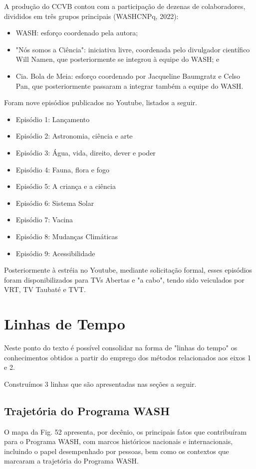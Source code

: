 A produção do CCVB contou com a participação de dezenas de colaboradores, divididos em três grupos principais (WASHCNPq, 2022):


\begin{itemize}
\item WASH: esforço coordenado pela autora;
\item "Nós somos a Ciência": iniciativa livre, coordenada pelo divulgador científico Will Namen, que posteriormente se integrou à equipe do WASH; e
\item Cia. Bola de Meia: esforço coordenado por Jacqueline Baumgratz e Celso Pan, que posteriormente passaram  a integrar também a equipe do WASH.
\end{itemize}

Foram nove episódios publicados no Youtube, listados a seguir.


\begin{itemize}
\item Episódio 1: Lançamento
\item Episódio 2: Astronomia, ciência e arte
\item Episódio 3: Água, vida, direito, dever e poder
\item Episódio 4: Fauna, flora e fogo
\item Episódio 5: A criança e a ciência
\item Episódio 6: Sistema Solar
\item Episódio 7: Vacina
\item Episódio 8: Mudanças Climáticas
\item Episódio 9: Acessibilidade
\end{itemize}

Posteriormente à estréia no Youtube, mediante solicitação formal, esses episódios foram disponibilizados para TVs Abertas e "a cabo", tendo sido veiculados por VRT, TV Taubaté e TVT.

\section[Linhas de Tempo]{Linhas de Tempo}\label{Linhas de Tempo}
Neste ponto do texto é possível consolidar na forma de "linhas do tempo" os conhecimentos obtidos a partir do emprego dos métodos relacionados aos eixos 1 e 2.

Construímos 3 linhas que são apresentadas nas seções a seguir.

\subsection[Trajetória do Programa WASH]{Trajetória do Programa WASH}\label{Trajetória do Programa WASH}
O mapa da Fig. 52 apresenta, por decênio, os principais fatos que contribuíram para o Programa WASH, com marcos históricos nacionais e internacionais, incluindo o papel desempenhado por pessoas, bem como os contextos que marcaram a trajetória do Programa WASH.




